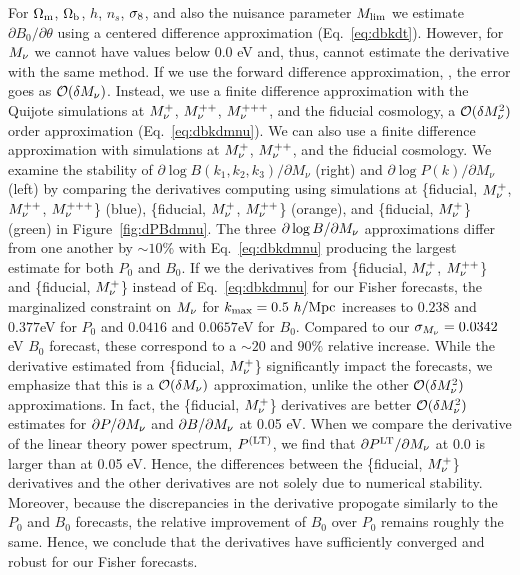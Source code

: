 For $\Omega_{\rm m}$, $\Omega_{\rm b}$, $h$, $n_s$, $\sigma_8$, and also the nuisance parameter $M_{\rm lim}$ 
we estimate $\partial B_0/\partial \theta$ using a centered difference approximation 
(Eq.~\ref{eq:dbkdt}). However, for $M_\nu$ we cannot have values below 0.0 eV 
and, thus, cannot estimate the derivative with the same method. If we use the 
forward difference approximation, 
\beq 
{} \approx {}, 
\eeq
the error goes as $\mathcal{O}(\delta M_\nu)$. Instead, we use a finite difference
approximation with the Quijote simulations at $M_\nu^{+}$, $M_\nu^{++}$, $M_\nu^{+++}$, 
and the fiducial cosmology, a $\mathcal{O}(\delta M_\nu^2)$ order approximation 
(Eq.~\ref{eq:dbkdmnu}). We can also use a finite difference approximation with 
simulations at $M_\nu^{+}$, $M_\nu^{++}$, and the fiducial cosmology. We examine
the stability of $\partial \log B(k_1, k_2, k_3)/\partial M_\nu$ (right) and 
$\partial \log P(k)/\partial M_\nu$ (left) by comparing the derivatives computing
using simulations at \{fiducial, $M_\nu^{+}$, $M_\nu^{++}$, $M_\nu^{+++}$\} (blue), 
\{fiducial, $M_\nu^{+}$, $M_\nu^{++}$\} (orange), and \{fiducial, $M_\nu^{+}$\} 
(green) in Figure~\ref{fig:dPBdmnu}. The three $\partial \log B/\partial M_\nu$
approximations differ from one another by $\sim10\%$ with Eq.~\ref{eq:dbkdmnu} 
producing the largest estimate for both $P_0$ and $B_0$. If we the derivatives
from \{fiducial, $M_\nu^{+}$, $M_\nu^{++}$\} and \{fiducial, $M_\nu^{+}$\} instead
of Eq.~\ref{eq:dbkdmnu} for our Fisher forecasts, the marginalized constraint on
$M_\nu$ for $k_{\rm max} = 0.5~h/{\rm Mpc}$ increases to $0.238$ and $0.377$eV for $P_0$ 
and $0.0416$ and $0.0657$eV for $B_0$. Compared to our $\sigma_{M_\nu} = 0.0342$ eV 
$B_0$ forecast, these correspond to a $\sim20$ and $90\%$ relative increase. 
While the derivative estimated from \{fiducial, $M_\nu^{+}$\} significantly impact 
the forecasts, we emphasize that this is a $\mathcal{O}(\delta M_\nu)$ approximation, 
unlike the other $\mathcal{O}(\delta M_\nu^2)$ approximations. In fact, the 
\{fiducial, $M_\nu^{+}$\} derivatives are better $\mathcal{O}(\delta M_\nu^2)$ estimates
for $\partial P/\partial M_\nu$ and $\partial B/\partial M_\nu$ at 0.05 eV. When we 
compare the derivative of the linear theory power spectrum, $P^{(\rm LT)}$, we find 
that $\partial P^{\rm LT}/\partial M_\nu$ at 0.0 is larger than at 0.05 eV. Hence, 
the differences between the \{fiducial, $M_\nu^{+}$\} derivatives and the other 
derivatives are not solely due to numerical stability. Moreover, because the 
discrepancies in the derivative propogate similarly to the $P_0$ and $B_0$ forecasts, 
the relative improvement of $B_0$ over $P_0$ remains roughly the same. Hence, we conclude 
that the derivatives have sufficiently converged and robust for our Fisher forecasts.

